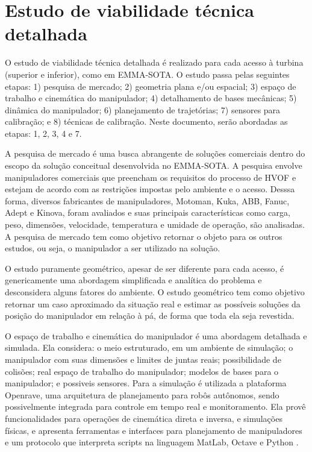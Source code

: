 \section{Estudo de viabilidade técnica detalhada}\label{sec::viatec}
O estudo de viabilidade técnica detalhada é realizado para cada acesso à turbina
(superior e inferior), como em EMMA-SOTA. O estudo passa pelas
seguintes etapas: 1) pesquisa de mercado; 2) geometria plana e/ou espacial; 3)
espaço de trabalho e cinemática do manipulador; 4) detalhamento de
bases mecânicas; 5) dinâmica do manipulador; 6) planejamento de trajetórias; 7)
sensores para calibração; e 8) técnicas de calibração.
Neste documento, serão abordadas as etapas: 1, 2, 3, 4 e 7.

A pesquisa de mercado é uma busca abrangente de soluções comerciais dentro do
escopo da solução conceitual desenvolvida no EMMA-SOTA. A pesquisa envolve
manipuladores comerciais que preencham os requisitos do processo de HVOF e
estejam de acordo com as restrições impostas pelo ambiente e o acesso. Desssa
forma, diversos fabricantes de manipuladores, Motoman, Kuka, ABB, Fanuc,
Adept e Kinova, foram avaliados e suas principais características como carga,
peso, dimensões, velocidade, temperatura e umidade de operação, são analisadas.
A pesquisa de mercado tem como objetivo retornar o objeto para os outros
estudos, ou seja, o manipulador a ser utilizado na solução.

O estudo puramente geométrico, apesar de ser diferente para cada acesso, é
genericamente uma abordagem simplificada e analítica do problema e desconsidera
alguns fatores do ambiente. O estudo geométrico tem como objetivo retornar um caso
aproximado da situação real e estimar as possíveis soluções da posição do
manipulador em relação à pá, de forma que toda ela seja revestida.

O espaço de trabalho e cinemática do manipulador é uma abordagem
detalhada e simulada. Ela considera: o meio estruturado, em um ambiente de
simulação; o manipulador com suas dimensões e limites de juntas reais;
possibilidade de colisões; real espaço de trabalho do manipulador; modelos de
bases para o manipulador; e possiveis sensores. Para a simulação é utilizada a
plataforma Openrave, uma arquitetura de planejamento para robôs autônomos,
sendo possivelmente integrada para controle em tempo real e monitoramento.
Ela provê funcionalidades para operações de cinemática direta e inversa, e
simulações físicas, e apresenta ferramentas e interfaces para planejamento de
manipuladores e um protocolo que interpreta scripts na linguagem MatLab, Octave
e Python \citep{diankov2008openrave}.


